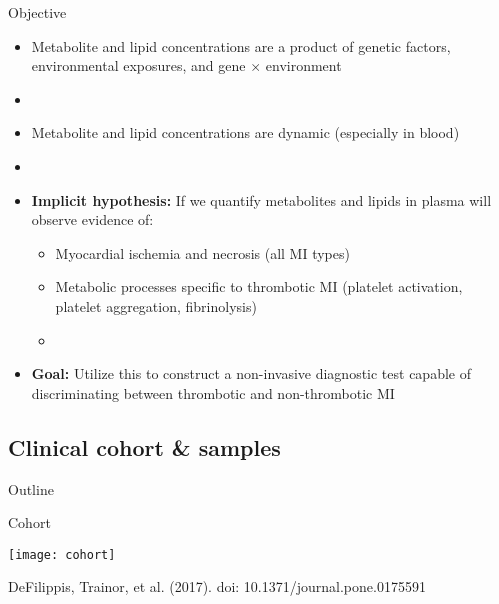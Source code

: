 \documentclass[xcolor=dvipsnames]{beamer}
\begin{document}
\begin{frame}{Objective}
\vspace{-10pt}
\begin{itemize}
\item Metabolite and lipid concentrations are a product of genetic factors, environmental exposures, and gene $\times$ environment \pause
\item[]
\item Metabolite and lipid concentrations are dynamic (especially in blood) \pause
\item[]
\item \textbf{Implicit hypothesis:} If we quantify metabolites and lipids in plasma will observe evidence of:
\begin{itemize}
\item Myocardial ischemia and necrosis (all MI types)
\item Metabolic processes specific to thrombotic MI (platelet activation, platelet aggregation, fibrinolysis) \pause
\item[]
\end{itemize}
\item \textbf{Goal:} Utilize this to construct a non-invasive diagnostic test capable of discriminating between thrombotic and non-thrombotic MI
\end{itemize}
\end{frame}

\subsection{Clinical cohort \& samples}
\begin{frame}{Outline}
\vspace{-10.5pt}
\tableofcontents[currentsection,subsectionstyle=show/shaded/hide]
\end{frame}

\begin{frame}{Cohort}
\vspace{-10pt}
\begin{center}
\texttt{[image: cohort]}

DeFilippis, Trainor, et al. (2017). doi: 10.1371/journal.pone.0175591
\end{center}
\end{frame}
\end{document}
